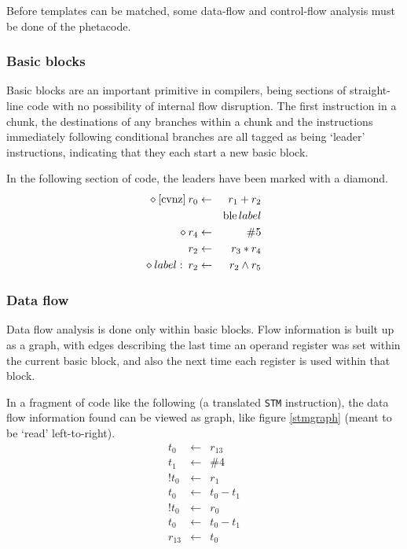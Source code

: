 Before templates can be matched, some data-flow and control-flow analysis must be done of the phetacode.

\subsubsection{Basic blocks}

Basic blocks are an important primitive in compilers, being sections of straight-line code with no possibility of internal flow disruption. The first instruction in a chunk, the destinations of any branches within a chunk and the instructions immediately following conditional branches are all tagged as being `leader' instructions, indicating that they each start a new basic block.

In the following section of code, the leaders have been marked with a diamond.
\begin{eqnarray*}
\diamond \: \mathrm{[cvnz]}\: r_0& \leftarrow & r_1 + r_2\\
 & & \mathop{\rm ble} label\\
\diamond \: r_4 & \leftarrow & \#5\\
r_2 & \leftarrow & r_3 * r_4\\
\diamond \: label:\: r_2 & \leftarrow & r_2 \wedge r_5
\end{eqnarray*}

\subsubsection{Data flow}

Data flow analysis is done only within basic blocks. Flow information is built up as a graph, with edges describing the last time an operand register was set within the current basic block, and also the next time each register is used within that block.

In a fragment of code like the following (a translated {\tt STM} instruction), the data flow information found can be viewed as graph, like figure \ref{stmgraph} (meant to be `read' left-to-right).
\begin{eqnarray*}
t_0 & \leftarrow & r_{13}\\
t_1 & \leftarrow & \#4\\
!t_0 & \leftarrow & r_1\\
t_0 & \leftarrow & t_0 - t_1\\
!t_0 & \leftarrow & r_0\\
t_0 & \leftarrow & t_0 - t_1\\
r_{13} & \leftarrow & t_0
\end{eqnarray*}

